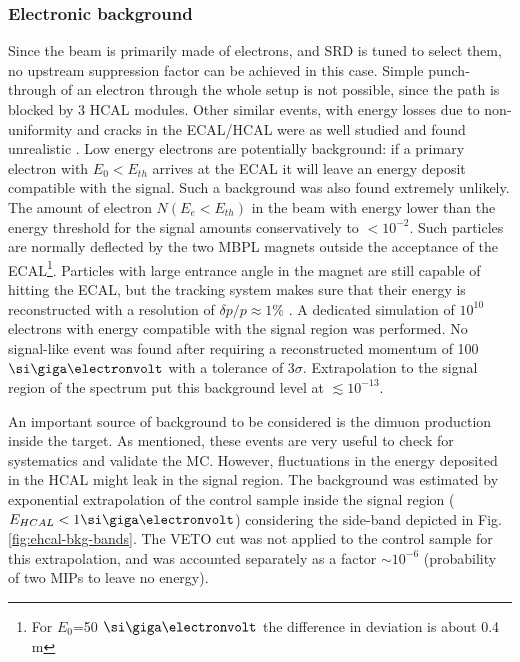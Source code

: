 \subsubsection{Electronic background}
\label{ch3:sec:bkg:inv:elec}

Since the beam is primarily made of electrons, and SRD is tuned to select them, no upstream suppression factor can be achieved in this case. Simple punch-through of an electron through the whole setup is not possible, since the path is blocked by 3 HCAL modules. Other similar events, with energy losses due to non-uniformity and cracks in the ECAL/HCAL were as well studied and found unrealistic \cite{Andreas:2013lya}. Low energy electrons are potentially background: if a primary electron with $E_0 < E_{th}$ arrives at the ECAL it will leave an energy deposit compatible with the signal. Such a background was also found extremely unlikely. The amount of electron $N(E_e<E_{th})$ in the beam with energy lower than the energy threshold for the signal amounts conservatively to $<10^{-2}$. Such particles are normally deflected by the two MBPL magnets outside the acceptance of the ECAL\footnote{For $E_0$=50 $\gev$ the difference in deviation is about 0.4 \si{\meter}}. Particles with large entrance angle in the magnet are still capable of hitting the ECAL, but the tracking system makes sure that their energy is reconstructed with a resolution of $\delta p/p \approx 1\%$ \cite{Banerjee:2017mdu}. A dedicated simulation of $10^{10}$ electrons with energy compatible with the signal region was performed. No signal-like event was found after requiring a reconstructed momentum of 100 $\gev$ with a tolerance of 3$\sigma$. Extrapolation to the signal region of the spectrum put this background level at $\lesssim 10^{-13}$.

An important source of background to be considered is the dimuon production inside the target. As mentioned, these events are very useful to check for systematics and validate the MC. However, fluctuations in the energy deposited in the HCAL might leak in the signal region. The background was estimated by exponential extrapolation of the control sample inside the signal region ($E_{HCAL} < 1 \gev$) considering the side-band depicted in Fig.\ref{fig:ehcal-bkg-bands}. The VETO cut was not applied to the control sample for this extrapolation, and was accounted separately as a factor $\sim 10^{-6}$ (probability of two MIPs to leave no energy).

